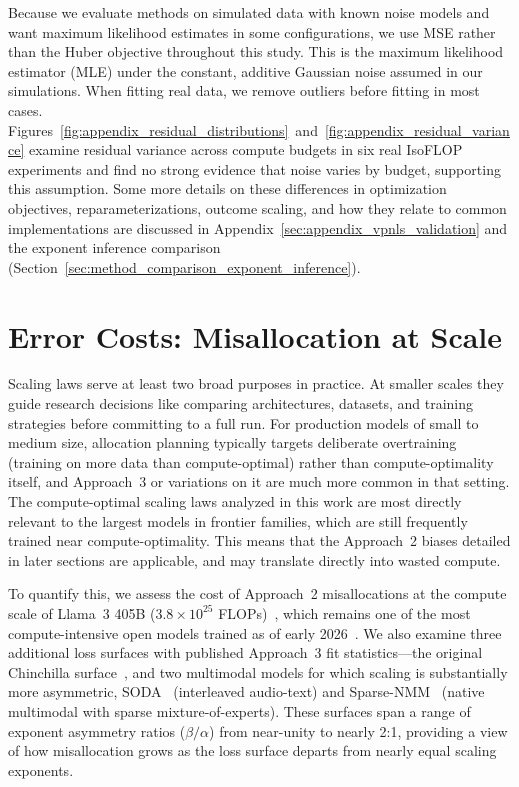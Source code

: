 \documentclass[11pt]{article}
\begin{document}
Because we evaluate methods on simulated data with known noise models and
want maximum likelihood estimates in some configurations, we use MSE rather
than the Huber objective throughout this study. This is the maximum likelihood
estimator (MLE) under the constant, additive Gaussian noise assumed in our
simulations. When fitting real data, we remove outliers before fitting in
most cases.
Figures~\ref{fig:appendix_residual_distributions}~and~\ref{fig:appendix_residual_variance} examine residual variance
across compute budgets in six real IsoFLOP experiments and find no strong
evidence that noise varies by budget, supporting this assumption. Some more details on these differences in optimization objectives,
reparameterizations, outcome scaling, and how they relate to common
implementations are discussed in
Appendix~\ref{sec:appendix_vpnls_validation} and the exponent inference
comparison (Section~\ref{sec:method_comparison_exponent_inference}).

\section{Error Costs: Misallocation at Scale}
\label{sec:error_costs}

Scaling laws serve at least two broad purposes in practice. At smaller scales
they guide research decisions like comparing architectures, datasets, and
training strategies before committing to a full run. For production models of
small to medium size, allocation planning typically targets deliberate
overtraining (training on more data than compute-optimal) rather than
compute-optimality itself, and Approach~3 or variations on it are much more
common in that setting. The compute-optimal scaling laws analyzed in this work
are most directly relevant to the largest models in frontier families, which
are still frequently trained near compute-optimality. This means that the Approach~2 biases detailed in later sections are
applicable, and may translate directly into wasted compute.

To quantify this, we assess the cost of Approach~2 misallocations at the
compute scale of Llama~3 405B ($3.8\times10^{25}$
FLOPs)~\citep{llama3}, which remains one of the most compute-intensive open
models trained as of early
2026~\citep{epochai_model_database}. We also examine three additional loss
surfaces with published Approach~3 fit statistics---the original Chinchilla
surface~\citep{chinchilla}, and two multimodal models for which scaling is
substantially more asymmetric,
SODA~\citep{audio_scaling} (interleaved audio-text) and
Sparse-NMM~\citep{nmm_scaling} (native multimodal with sparse
mixture-of-experts). These surfaces span a range of exponent asymmetry ratios
($\beta/\alpha$) from near-unity to nearly 2:1, providing a view of how misallocation grows as the loss surface departs from
nearly equal scaling exponents.
\end{document}

